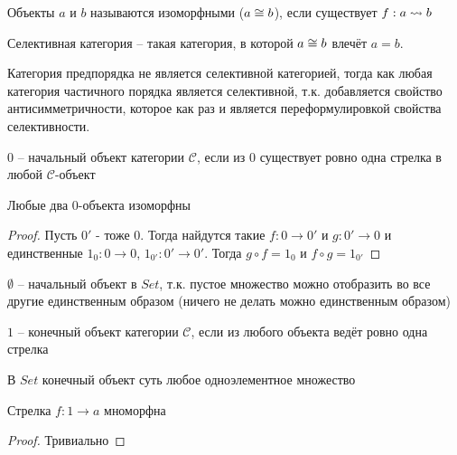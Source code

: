 \begin{defn}
  Объекты $a$ и $b$ называются изоморфными ($a \cong b$), если существует $f: a \rightsquigarrow b$
\end{defn}

\begin{defn}
  Селективная категория -- такая категория, в которой $a \cong b$ влечёт $a = b$.
\end{defn}

\begin{exm}
  Категория предпорядка не является селективной категорией, тогда как любая
  категория частичного порядка является селективной, т.к. добавляется свойство
  антисимметричности, которое как раз и является переформулировкой свойства
  селективности.
\end{exm}

\begin{defn}
  $0$ -- начальный объект категории $\mathcal{C}$, если из $0$ существует ровно одна
  стрелка в любой $\mathcal{C}$-объект
\end{defn}

\begin{stmt}
  Любые два $0$-объекта изоморфны
\end{stmt}
\begin{proof}
  Пусть $0'$ - тоже $0$. Тогда найдутся такие $f \colon 0 \to 0'$ и $g \colon 0' \to 0$ и
  единственные $1_0 \colon 0 \to 0$, $1_{0'} \colon 0' \to 0'$. Тогда
  $g \circ f = 1_0$ и $f \circ g = 1_{0'}$
\end{proof}

\begin{exm}
  $\emptyset$ -- начальный объект в $Set$, т.к. пустое множество можно
  отобразить во все другие единственным образом (ничего не делать можно
  единственным образом)
\end{exm}

\begin{defn}
  $1$ -- конечный объект категории $\mathcal{C}$, если из любого объекта
  ведёт ровно одна стрелка
\end{defn}

\begin{exm}
  В $Set$ конечный объект суть любое одноэлементное множество
\end{exm}

\begin{task}
  Стрелка $f \colon 1 \to a$ мноморфна
\end{task}
\begin{proof}
  Тривиально
\end{proof}

